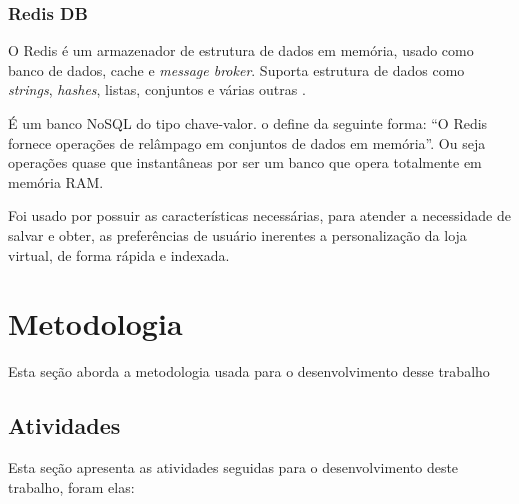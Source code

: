 \documentclass[a4paper,12pt]{monografia}
\begin{document}

\subsection{Redis DB} %
\label{sub:redis_db}

O Redis é um armazenador de estrutura de dados em memória, usado como banco de dados, cache e \textit{message broker}. Suporta estrutura de dados como \textit{strings}, \textit{hashes}, listas, conjuntos e várias outras \cite{redis}.

É um banco NoSQL do tipo chave-valor.  o define da seguinte forma:  ``O Redis fornece operações de relâmpago em conjuntos de dados em memória''. Ou seja operações quase que instantâneas por ser um banco que opera totalmente em memória RAM.

Foi usado por possuir as características necessárias, para atender a necessidade de salvar e obter, as preferências de usuário inerentes a personalização da loja virtual, de forma rápida e indexada.



\chapter{Metodologia} %
\label{cha:metodologia}

Esta seção aborda a metodologia usada para o desenvolvimento desse trabalho

\section{Atividades} %
\label{sec:atividades}

Esta seção apresenta as atividades seguidas para o desenvolvimento deste trabalho, foram elas:
\end{document}
